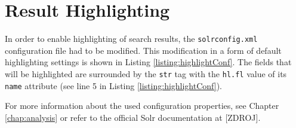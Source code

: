 

\section{Result Highlighting}

In order to enable highlighting of search results, the \texttt{solrconfig.xml} configuration file had to be modified.
This modification in a form of default highlighting settings is shown in Listing \ref{listing:highlightConf}.
The fields that will be highlighted are surrounded by the \texttt{str} tag with the \texttt{hl.fl} value of its \texttt{name} attribute (see line 5 in Listing \ref{listing:highlightConf}).

For more information about the used configuration properties, see Chapter \ref{chap:analysis} or refer to the official Solr documentation at [ZDROJ].


